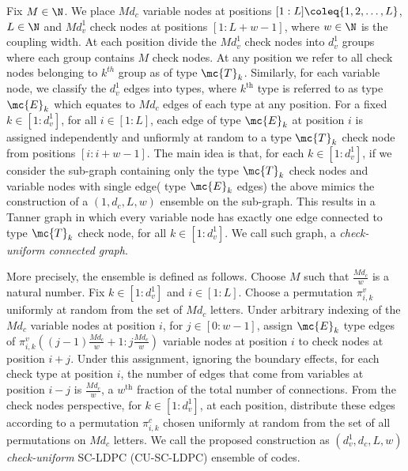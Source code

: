 \documentclass[journal]{IEEEtran}
\begin{document}
Fix $M\in \N$. We place $M d_{c}$ variable nodes at positions $[1: L]\coleq\{1,2,\ldots ,L\}$, $L\in\N$ and $Md_{v}^{1}$ check nodes at positions $[1 : L+w-1]$, where $w\in \N$ is the coupling width. At each position divide the $Md_{v}^{1}$ check nodes into $d_{v}^{1}$ groups where each group contains $M$ check nodes. At any position we refer to all check nodes belonging to $k^{th}$ group as of type $\mc{T}_{k}$. Similarly, for each variable node, we classify the $d_{v}^{1}$ edges into types, where $k^{\text{th}}$ type is referred to as type $\mc{E}_{k}$ which equates to $Md_{c}$ edges of each type at any position. For a fixed $k \in [1 : d_{v}^{1}]$, for all $i \in [1 : L]$, each edge of type $\mc{E}_{k}$ at position $i$ is assigned independently and unfiormly at random to a type $\mc{T}_{k}$ check node from positions $[i : i+w-1]$. The main idea is that, for each $k\in [1:d_{v}^{1}]$, if we consider the sub-graph containing only the type $\mc{T}_{k}$ check nodes and variable nodes with single edge( type $\mc{E}_{k}$ edges) the above mimics the construction of a $(1,d_{c},L,w)$ ensemble \cite{KudekarUrbanke11} on the sub-graph. This results in a Tanner graph in which every variable node has exactly one edge connected to type $\mc{T}_{k}$ check node, for all $k \in [1: d_{v}^{1}]$. We call such graph, a \textit{check-uniform connected graph}.

More precisely, the ensemble is defined as follows. Choose $M$ such that $\frac{Md_{c}}{w}$ is a natural number. Fix $k\in[1:d_{v}^{1}]$ and $i\in[1:L]$. Choose a permutation $\pi^{v}_{i,k}$ uniformly at random from the set of $Md_{c}$ letters. Under arbitrary indexing of the $Md_{c}$ variable nodes at position $i$, for $j\in [0:w-1]$, assign $\mc{E}_{k}$ type edges of $\pi^{v}_{i,k}\left((j-1)\frac{Md_{c}}{w}+1:j\frac{Md_{c}}{w}\right)$ variable nodes at position $i$ to check nodes at position $i+j$. Under this assignment, ignoring the boundary effects, for each check type at position $i$, the number of edges that come from variables at position $i-j$ is $\frac{Md_{c}}{w}$, a $w^{\text{th}}$ fraction of the total number of connections. From the check nodes perspective, for $k\in[1:d_{v}^{1}]$, at  each position, distribute these edges according to a permutation $\pi^{c}_{i,k}$ chosen uniformly at random from the set of all permutations on $Md_{c}$ letters. We call the proposed construction as $(d_{v}^{1},d_{c},L,w)$ \textit{check-uniform} SC-LDPC (CU-SC-LDPC) ensemble of codes.  
\end{document}
